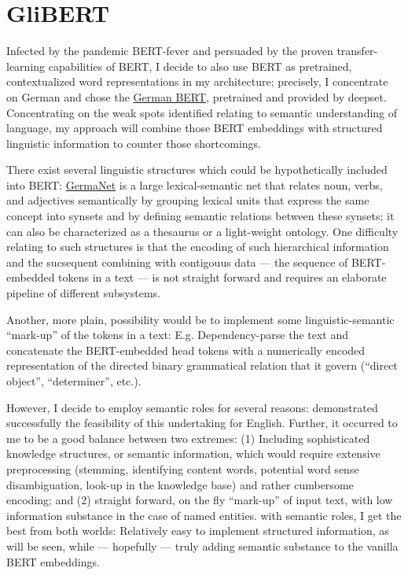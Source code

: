 \section{GliBERT}

Infected by the pandemic BERT-fever and persuaded by the proven transfer-learning
capabilities of BERT, I decide to also use BERT as pretrained, contextualized word
representations in my architecture; precisely, I concentrate on German and chose
the \href{https://deepset.ai/german-bert}{German BERT}, pretrained and provided
by deepset. Concentrating on the weak spots identified relating to semantic
understanding of language, my approach will combine those BERT embeddings with
structured linguistic information to counter those shortcomings.

There exist several linguistic structures which could be hypothetically included into BERT:
\href{https://uni-tuebingen.de/en/faculties/faculty-of-humanities/departments/modern-languages/department-of-linguistics/chairs/general-and-computational-linguistics/ressources/lexica/germanet/}{GermaNet}
\citep{hamp1997germanet} is a large lexical-semantic net that relates noun, verbs, and
adjectives semantically by grouping lexical units that express the same concept into synsets
and by defining semantic relations between these synsets; it can also be characterized as a
thesaurus or a light-weight ontology. One difficulty relating to such structures is
that the encoding of such hierarchical information and the sucsequent combining with
contigouus data --- the sequence of BERT-embedded tokens in a text --- is not straight forward
and requires an elaborate pipeline of different subsystems.

Another, more plain, possibility would be to implement some linguistic-semantic ``mark-up'' of
the tokens in a text: E.g. Dependency-parse the text and concatenate the BERT-embedded head tokens
with a numerically encoded representation of the directed binary grammatical relation
that it govern (``direct object'', ``determiner'', etc.).


However, I decide to employ semantic roles for several reasons: \citeauthor{zhang2019semantics}
demonstrated successfully the feasibility of this undertaking for English. Further, it occurred to
me to be a good balance between two extremes: (1) Including sophisticated knowledge structures, or
semantic information, which would require extensive preprocessing (stemming, identifying content
words, potential word sense disambiguation, look-up in the knowledge base) and rather cumbersome
encoding; and (2) straight forward, on the fly ``mark-up'' of input text, with low information
substance in the case of named entities. with semantic roles, I get the best from both worlds:
Relatively easy to implement structured information, as will be seen, while --- hopefully ---
truly adding semantic substance to the vanilla BERT embeddings.

